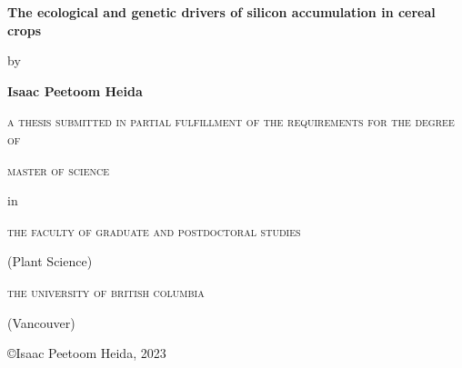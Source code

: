 \begin{titlepage}
    \begin{center}
        \vspace*{1cm}

        \textbf{The ecological and genetic drivers of silicon accumulation in cereal crops}

        \vspace{1cm}

        by 

        \vspace{1cm}

        \textbf{Isaac Peetoom Heida}
        
        \vfill

        \textsc{a thesis submitted in partial fulfillment of the requirements for the degree of}

        \vspace{1cm}

        \textsc{master of science}

        in

        \textsc{the faculty of graduate and postdoctoral studies}

        (Plant Science)

        \textsc{the university of british columbia}

        (Vancouver)

        \copyright Isaac Peetoom Heida, 2023
    \end{center}
\end{titlepage}